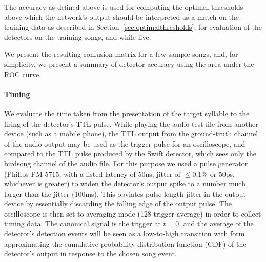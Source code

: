 \documentclass[10pt,letterpaper]{article}
\renewcommand{\subsubsection}[1]{\paragraph{#1}}
\newcommand\argmin{\mathop{\mbox{{\rm argmin}}}\limits}
\newcommand{\noprint}[1]{}
\begin{document}
The accuracy as defined above is used for computing the optimal thresholds above
which the network's output should be interpreted as a match on the
training data as described in Section~\ref{sec:optimalthresholds}, for
evaluation of the detectors on the training songs,
and while live.

We present the resulting confusion matrix for a few sample songs, and, for simplicity, we present a summary of detector accuracy using the area under the ROC curve.

\noprint{
Since the network
will output values $o_t$ between 0 and 1 at each moment $t$ in an
attempt to match the training output, the optimal threshold
$\tau\in[0,1]$ for the output neuron should be computed.  Given the
relative cost of false positives vs.~false negatives $C$, and the
acceptable time difference between target syllable and correct output
$\Delta t_d$, we compute the optimal threshold for an output element
according to the definitions above:
\begin{eqnarray*}
  \mbox{true positives}_\tau &=& \mbox{size of set}_{s\in \mbox{target songs}} o_t > \tau, \left| t \leq \Delta t_d \right| \\
  \mbox{false negatives}_\tau &=& \mbox{size of set} {s\in\mbox{target songs}} - \mbox{size of set} \mbox{true positives} \\
  \mbox{false positives}_\tau &=& \mbox{size of set}_{s\in \mbox{target songs}} o_t > \tau, \left| t > \Delta t_d \right| \\
  \widehat{\tau} &=& \argmin_\tau C\mbox{false positive} + \mbox{false negatives}
\end{eqnarray*}
}

\subsubsection{Timing}

We evaluate the time taken from the presentation of the target
syllable to the firing of the detector's TTL pulse. While playing the
audio test file from another device (such as a mobile phone), the TTL
output from the ground-truth channel of the audio output may be used
as the trigger pulse for an oscilloscope, and compared to the TTL pulse
produced by the Swift detector, which sees only the birdsong channel
of the audio file. For this purpose we used a pulse
generator (Philips PM 5715, with a listed latency of 50ns, jitter 
of $\leq 0.1\%$ or 50ps, whichever is greater) to widen the
detector's output spike to a number much larger than the jitter (100ms).  This obviates pulse length jitter in the output device by essentially discarding the falling edge of the output pulse.  The oscilloscope is then set to
averaging mode (128-trigger average) in order to collect timing data. The canonical signal is the trigger at $t=0$, and the
average of the detector's detection events will be seen as a
low-to-high transition with form approximating the cumulative
probability distribution function (CDF) of the detector's output in
response to the chosen song event.
\end{document}
